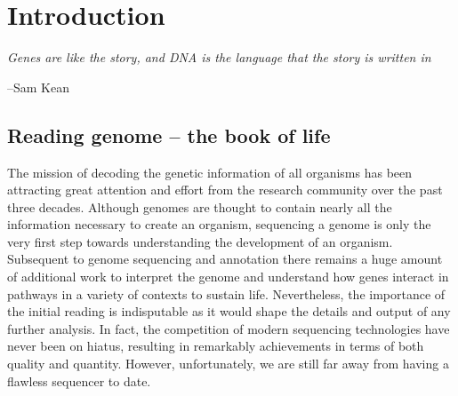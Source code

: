 \chapter{Introduction}\label{ch:intro}
\thispagestyle{empty}
\vspace*{\fill}
\epigraph{\emph{Genes are like the story, and DNA is the language that the story is written in}}
{--Sam Kean}

\clearpage
\section{Reading genome -- the book of life}
% 
The mission of decoding the genetic information of all organisms has been attracting great attention and effort from the research community over the past three decades. 
Although genomes are thought to contain nearly all the information necessary to create an organism, sequencing a genome is only the very first step towards understanding the development of an organism. 
Subsequent to genome sequencing and annotation there remains a huge amount of additional work to interpret the genome and understand how genes interact in pathways in a variety of contexts to sustain life. 
Nevertheless, the importance of the initial reading is indisputable as it would shape the details and output of any further analysis.
In fact, the competition of modern sequencing technologies have never been on hiatus, resulting in remarkably achievements in terms of both quality and quantity. 
However, unfortunately, we are still far away from having a flawless sequencer to date.

